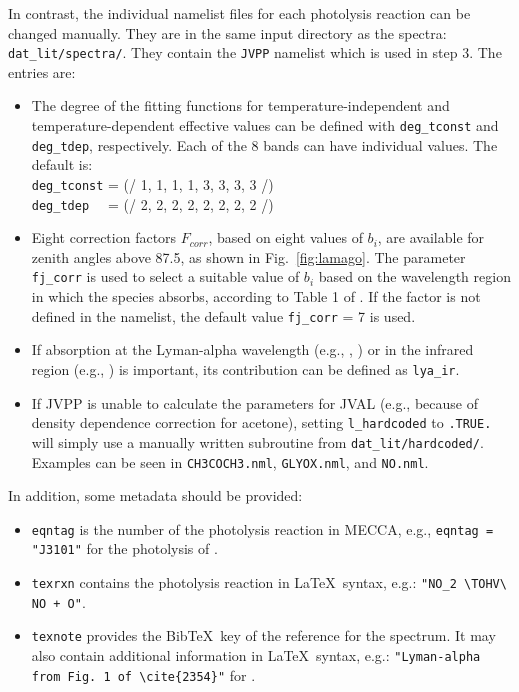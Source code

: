 \documentclass[a4paper,twoside]{article}
\newcommand{\IT}[1]{#1\index{#1}}
\def\nosep{\setlength\parsep{0mm}\setlength\topsep{0mm}\setlength\itemsep{0mm}}
\begin{document}
In contrast, the individual namelist files for each photolysis reaction
can be changed manually. They are in the same input directory as the
spectra: \verb|dat_lit/spectra/|. They contain the \verb|JVPP| namelist
which is used in step 3. The entries are:
\begin{itemize}\nosep
\item The degree of the fitting functions for temperature-independent
  and temperature-dependent effective values can be defined with
  \verb|deg_tconst| and \verb|deg_tdep|, respectively. Each of the 8
  bands can have individual values. The default is:\\
  \verb|deg_tconst| = (/ 1, 1, 1, 1, 3, 3, 3, 3 /)\\
  \verb|deg_tdep  | = (/ 2, 2, 2, 2, 2, 2, 2, 2 /)
\item Eight correction factors $F_{corr}$, based on eight values of
  $b_i$, are available for zenith angles above 87.5\degree, as shown in
  Fig.~\ref{fig:lamago}. The parameter \verb|fj_corr| is used to select
  a suitable value of $b_i$ based on the wavelength region in which the
  species absorbs, according to Table 1 of \citet{2642}. If the factor
  is not defined in the namelist, the default value \verb|fj_corr| = 7
  is used.
\item If absorption at the Lyman-alpha wavelength (e.g., ,
  ) or in the infrared region (e.g., ) is
  important, its contribution can be defined as \verb|lya_ir|.
\item If \IT{JVPP} is unable to calculate the parameters for \IT{JVAL} (e.g.,
  because of density dependence correction for acetone), setting
  \verb|l_hardcoded| to \verb|.TRUE.| will simply use a manually written
  subroutine from \verb|dat_lit/hardcoded/|. Examples can be seen in
  \verb|CH3COCH3.nml|, \verb|GLYOX.nml|, and \verb|NO.nml|.
\end{itemize}
In addition, some metadata should be provided:
\begin{itemize}\nosep
\item \verb|eqntag| is the number of the photolysis reaction in MECCA,
  e.g., \verb|eqntag = "J3101"| for the photolysis of .
\item \verb|texrxn| contains the photolysis reaction in La\TeX\ syntax,
  e.g.: \verb|"NO_2 \TOHV\ NO + O"|.
\item \verb|texnote| provides the Bib\TeX\ key of the reference for the
  spectrum. It may also contain additional information in La\TeX\
  syntax, e.g.: \verb|"Lyman-alpha from Fig. 1 of \cite{2354}"| for
  \chem{CH_4}.
\end{itemize}
\end{document}
